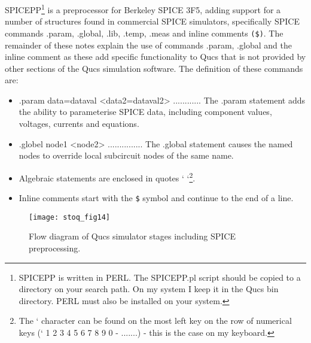 SPICEPP\footnote{SPICEPP is written in PERL. The SPICEPP.pl script should be copied to a directory on your search path. On my system I keep it in the Qucs bin directory. PERL must also be installed on your system.} is a preprocessor for Berkeley SPICE 3F5, adding support for a number of structures found in commercial SPICE simulators, specifically SPICE commands .param, .global, .lib, .temp, .meas and inline comments \verb|($)|. The remainder of these notes explain the use of commands .param, .global and the inline comment as these add specific functionality to Qucs that is not provided by other sections of the Qucs simulation software. The definition of these commands are:
\begin{itemize}
\item .param data=dataval <data2=dataval2> ............ 
The .param statement adds the ability to parameterise SPICE data, including component values, voltages, currents and equations.
\item .globel node1 <node2> ...............
The .global statement causes the named nodes to override local subcircuit nodes of the same name.
\item Algebraic statements are enclosed in quotes `        `\footnote{The ` character can be found on the most left key on the row of numerical keys (` 1 2 3 4 5 6 7 8 9 0 - .......) - this is the case on my keyboard.}.
\item Inline comments start with the \verb|$| symbol and continue to the end of a line.
\end{itemize}

  


 

\begin{figure}
  \centering
  \texttt{[image: stoq\_fig14]}
  \caption{Flow diagram of Qucs simulator stages including SPICE preprocessing.}
  \label{fig:stoq_fig14}
\end{figure} 

